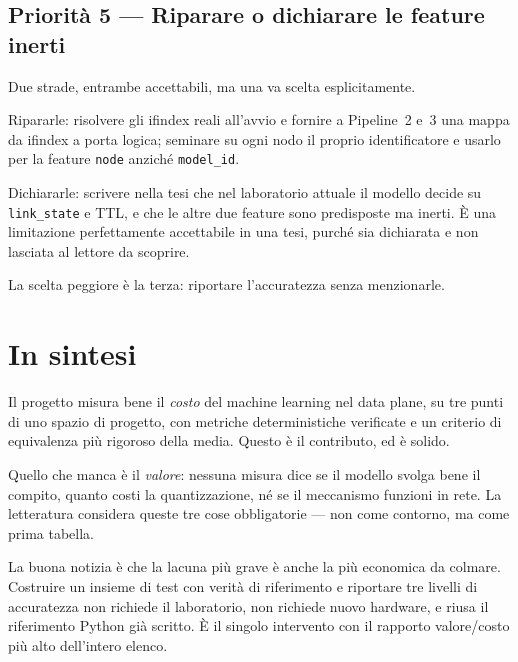 \documentclass[11pt,a4paper,oneside]{report}
\begin{document}
\section{Priorità 5 --- Riparare o dichiarare le feature inerti}

Due strade, entrambe accettabili, ma una va scelta esplicitamente.

Ripararle: risolvere gli ifindex reali all'avvio e fornire a
Pipeline~2 e~3 una mappa da ifindex a porta logica; seminare su ogni
nodo il proprio identificatore e usarlo per la feature \texttt{node}
anziché \texttt{model\_id}.

Dichiararle: scrivere nella tesi che nel laboratorio attuale il modello
decide su \texttt{link\_state} e TTL, e che le altre due feature sono
predisposte ma inerti. È una limitazione perfettamente accettabile in
una tesi, purché sia dichiarata e non lasciata al lettore da scoprire.

La scelta peggiore è la terza: riportare l'accuratezza senza
menzionarle.

\chapter{In sintesi}

Il progetto misura bene il \emph{costo} del machine learning nel data
plane, su tre punti di uno spazio di progetto, con metriche
deterministiche verificate e un criterio di equivalenza più rigoroso
della media. Questo è il contributo, ed è solido.

Quello che manca è il \emph{valore}: nessuna misura dice se il modello
svolga bene il compito, quanto costi la quantizzazione, né se il
meccanismo funzioni in rete. La letteratura considera queste tre cose
obbligatorie --- non come contorno, ma come prima tabella.

La buona notizia è che la lacuna più grave è anche la più economica da
colmare. Costruire un insieme di test con verità di riferimento e
riportare tre livelli di accuratezza non richiede il laboratorio, non
richiede nuovo hardware, e riusa il riferimento Python già scritto.
È il singolo intervento con il rapporto valore/costo più alto
dell'intero elenco.
\end{document}
